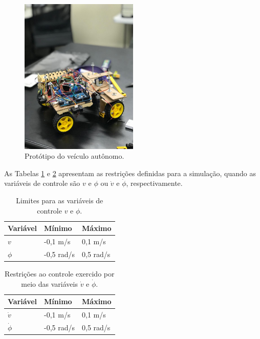\begin{enumerate}[label=\alph*)]
	\begin{figure}[H]
		\centering
		\includegraphics[width=0.5\textwidth]{02_desenvolvimento/04_EC_Fig_CarrinhoFoto.jpeg}
		\caption{Protótipo do veículo autônomo.}
		\label{fig:4ec-carrinhofoto}
	\end{figure}
	
	As Tabelas \ref{tab:4ec-carrinholimacoes1} e \ref{tab:4ec-carrinholimacoes2} apresentam as restrições definidas para a simulação, quando as variáveis de controle são $v$ e $\phi$ ou $\dot{v}$ e $\dot{\phi}$, respectivamente.
	
	\begin{table}[H]
		\centering
		\caption{Limites para as variáveis de controle $v$ e $\phi$.}
		\label{tab:4ec-carrinholimacoes1}
		\begin{tabular}{l|l|l} \toprule
			{Variável} & {Mínimo} & {Máximo}\\ \midrule
			{$v$} & {-0,1 \si{m/s}} & {0,1 \si{m/s}} \\
			{$\phi$} & {-0,5 \si{rad/s}} & {0,5 \si{rad/s}} \\
			\bottomrule
		\end{tabular}
	\end{table}

	\begin{table}[H]
		\centering
		\caption{Restrições ao controle exercido por meio das variáveis $\dot{v}$ e $\dot{\phi}$.}
		\label{tab:4ec-carrinholimacoes2}
		\begin{tabular}{l|l|l} \toprule
			{Variável} & {Mínimo} & {Máximo}\\ \midrule
			{$\dot{v}$} & {-0,1 \si{m/s}} & {0,1 \si{m/s}} \\
			{$\dot{\phi}$} & {-0,5 \si{rad/s}} & {0,5 \si{rad/s}} \\
			\bottomrule
		\end{tabular}
	\end{table}
	

\end{enumerate}
